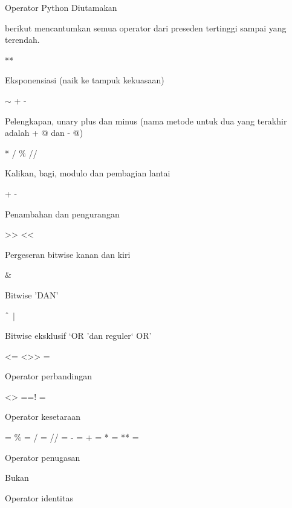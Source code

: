 \noindent
Operator Python Diutamakan \par
\vspace{12pt}
\noindent
 berikut mencantumkan semua operator dari preseden tertinggi sampai yang terendah. \par
\vspace{12pt}
\noindent
** \par
\noindent
Eksponensiasi (naik ke tampuk kekuasaan) \par
\vspace{12pt}
\noindent
 $  \sim  $ + - \par
\noindent
Pelengkapan, unary plus dan minus (nama metode untuk dua yang terakhir adalah + @ dan - @) \par
\vspace{12pt}
\noindent
* / $  \%  $ // \par
\noindent
Kalikan, bagi, modulo dan pembagian lantai \par
\vspace{12pt}
\noindent
+ - \par
\noindent
Penambahan dan pengurangan \par
\vspace{12pt}
\noindent
>> << \par
\noindent
Pergeseran bitwise kanan dan kiri \par
\vspace{12pt}
\noindent
 $  \&  $ \par
\noindent
Bitwise 'DAN' \par
\vspace{12pt}
\noindent
 $  \string^  $  $  \vert  $ \par
\noindent
Bitwise eksklusif `OR 'dan reguler` OR' \par
\vspace{12pt}
\noindent
<= <>> = \par
\noindent
Operator perbandingan \par
\vspace{12pt}
\noindent
<> ==! = \par
\noindent
Operator kesetaraan \par
\vspace{12pt}
\noindent
= $  \%  $ = / = // = - = + = * = ** = \par
\noindent
Operator penugasan \par
\vspace{12pt}
\noindent
Bukan \par
\noindent
Operator identitas \par
\vspace{12pt}
